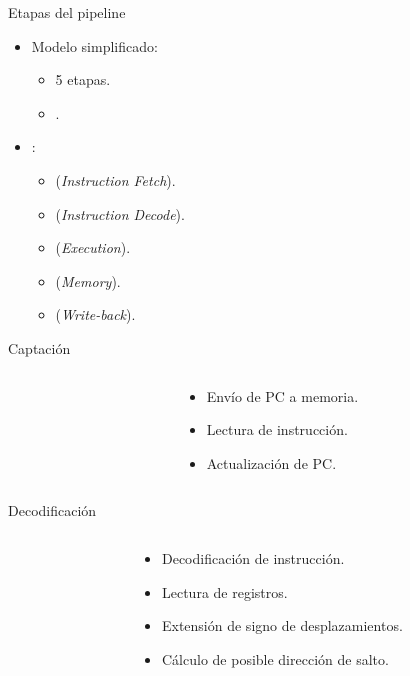 \begin{frame}[t]{Etapas del pipeline}
\begin{itemize}
  \item Modelo simplificado:
    \begin{itemize}
      \item 5 etapas.
      \item {}.
    \end{itemize}
  \item {}:
    \begin{itemize}
      \item {} (\emph{Instruction Fetch}).
      \item {} (\emph{Instruction Decode}).
      \item {} (\emph{Execution}).
      \item {} (\emph{Memory}).
      \item {} (\emph{Write-back}).
    \end{itemize}
\end{itemize}
\end{frame}

\begin{frame}[t]{Captación}
\begin{columns}
\begin{column}{.5\textwidth}

\end{column}
\begin{column}{.5\textwidth}
\begin{itemize}
  \item Envío de PC a memoria.
  \item Lectura de instrucción.
  \item Actualización de PC.
\end{itemize}
\end{column}
\end{columns}
\end{frame}

\begin{frame}[t]{Decodificación}
\begin{columns}
\begin{column}{.5\textwidth}

\end{column}
\begin{column}{.5\textwidth}
\begin{itemize}
  \item Decodificación de instrucción.
  \item Lectura de registros.
  \item Extensión de signo de desplazamientos.
  \item Cálculo de posible dirección de salto.
\end{itemize}
\end{column}
\end{columns}
\end{frame}

